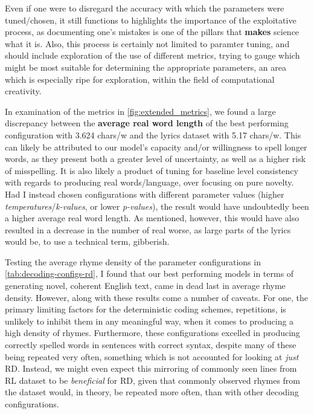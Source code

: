 Even if one were to disregard the accuracy with which the parameters were tuned/chosen, it still functions to highlights the importance of the exploitative process, as documenting one's mistakes is one of the pillars that \textbf{makes} science what it is. Also, this process is certainly not limited to paramter tuning, and should include exploration of the use of different metrics, trying to gauge which might be most suitable for determining the appropriate parameters, an area which is especially ripe for exploration, within the field of computational creativity.

In examination of the metrics in \cref{fig:extended_metrics}, we found a large discrepancy between the \textbf{average real word length} of the best performing configuration with 3.624 chars/w and the lyrics dataset with 5.17 chars/w. This can likely be attributed to our model’s capacity and/or willingness to spell longer words, as they present both a greater level of uncertainty, as well as a higher risk of misspelling. It is also likely a product of tuning for baseline level consistency with regards to producing real words/language, over focusing on pure novelty. Had I instead chosen configurations with different parameter values (higher \textit{temperatures}/\textit{k-values}, or lower \textit{p-values}), the result would have undoubtedly been a higher average real word length. As mentioned, however, this would have also resulted in a decrease in the number of real worse, as large parts of the lyrics would be, to use a technical term, gibberish.

Testing the average rhyme density of the parameter configurations in \cref{tab:decoding-configs-rd}, I found that our best performing models in terms of generating novel, coherent English text, came in dead last in average rhyme density. However, along with these results come a number of caveats. For one, the primary limiting factors for the deterministic coding schemes, repetitions, is unlikely to inhibit them in any meaningful way, when it comes to producing a high density of rhymes. Furthermore, these configurations excelled in producing correctly spelled words in sentences with correct syntax, despite many of these being repeated very often, something which is not accounted for looking at \textit{just} RD. Instead, we might even expect this mirroring of commonly seen lines from RL dataset to be \textit{beneficial} for RD, given that commonly observed rhymes from the dataset would, in theory, be repeated more often, than with other decoding configurations.

